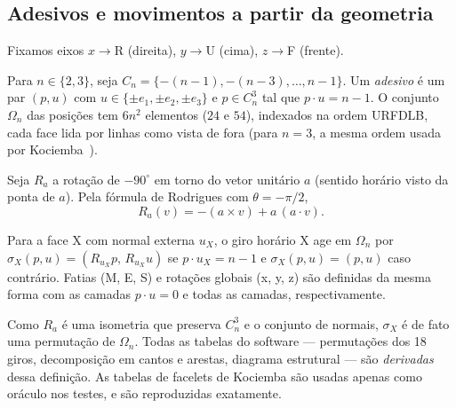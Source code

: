 \subsection{Adesivos e movimentos a partir da geometria}
Fixamos eixos $x\to$R (direita), $y\to$U (cima), $z\to$F (frente).
\begin{definition}[Adesivos]
Para $n\in\{2,3\}$, seja $C_n=\{-(n-1),-(n-3),\dots,n-1\}$. Um \emph{adesivo} é um par $(p,u)$ com $u\in\{\pm e_1,\pm e_2,\pm e_3\}$ e $p\in C_n^3$ tal que $p\cdot u=n-1$. O conjunto $\Omega_n$ das posições tem $6n^2$ elementos ($24$ e $54$), indexados na ordem URFDLB, cada face lida por linhas como vista de fora (para $n=3$, a mesma ordem usada por Kociemba~\cite{kociembaweb}).
\end{definition}
Seja $R_a$ a rotação de $-90^\circ$ em torno do vetor unitário $a$ (sentido horário visto da ponta de $a$). Pela fórmula de Rodrigues com $\theta=-\pi/2$,
\begin{equation}
R_a(v) = -(a\times v) + a\,(a\cdot v).
\end{equation}
\begin{definition}[Giro]
Para a face X com normal externa $u_X$, o giro horário X age em $\Omega_n$ por
$\sigma_X(p,u)=(R_{u_X}p,\,R_{u_X}u)$ se $p\cdot u_X=n-1$ e $\sigma_X(p,u)=(p,u)$ caso contrário. Fatias (M, E, S) e rotações globais (x, y, z) são definidas da mesma forma com as camadas $p\cdot u=0$ e todas as camadas, respectivamente.
\end{definition}
\noindent Como $R_a$ é uma isometria que preserva $C_n^3$ e o conjunto de normais, $\sigma_X$ é de fato uma permutação de $\Omega_n$. Todas as tabelas do software --- permutações dos 18 giros, decomposição em cantos e arestas, diagrama estrutural --- são \emph{derivadas} dessa definição. As tabelas de facelets de Kociemba são usadas apenas como oráculo nos testes, e são reproduzidas exatamente\ver.

